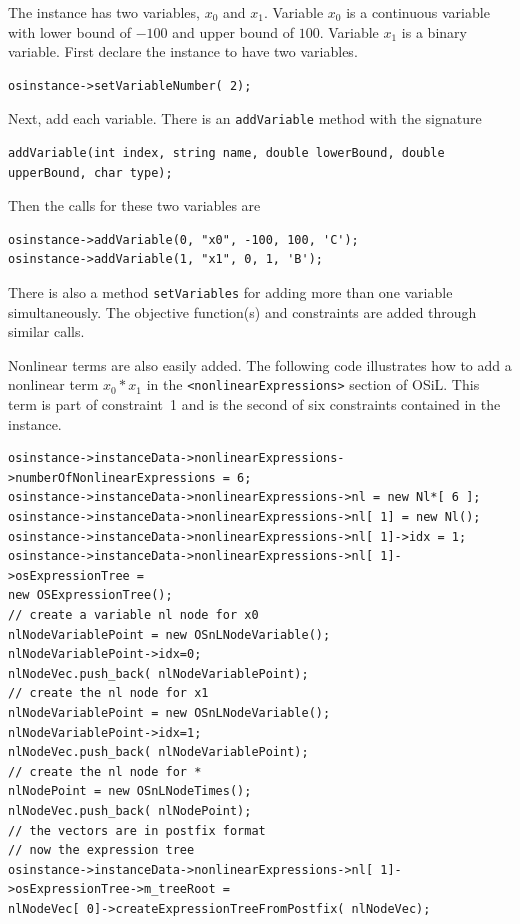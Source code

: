 \documentclass[11pt]{article}
\renewcommand{\_}{{\char"5F}}
\renewcommand{\{}{{\char"7B}}
\renewcommand{\}}{{\char"7D}}
\renewcommand{\^}{{\char"0D}}
\renewcommand{\'}{{\char"0D}}
\begin{document}
\begin{enumerate}[Step 1:]
The instance has two variables, $x_{0}$ and $x_{1}$. Variable $x_{0}$ is a continuous variable with lower bound of $-100$ and upper bound of $100$. Variable $x_{1}$ is a binary variable. First declare the instance to have two variables.
\begin{verbatim}
osinstance->setVariableNumber( 2);
\end{verbatim}
Next, add each variable. There is an {\tt addVariable} method with the signature
\begin{verbatim}
addVariable(int index, string name, double lowerBound, double upperBound, char type);
\end{verbatim}
Then the calls for these two variables are
\begin{verbatim}
osinstance->addVariable(0, "x0", -100, 100, 'C');
osinstance->addVariable(1, "x1", 0, 1, 'B');
\end{verbatim}
There is also a method {\tt setVariables} for adding more than one variable simultaneously.  The objective function(s) and constraints are added through similar calls.

Nonlinear terms are also easily added.  The following code illustrates how to add a nonlinear term
$x_{0}*x_{1}$ in the {\tt <nonlinearExpressions>} section of  OSiL. This term is part of constraint~1
and is the second of six constraints contained in the instance.
\begin{verbatim}
osinstance->instanceData->nonlinearExpressions->numberOfNonlinearExpressions = 6;
osinstance->instanceData->nonlinearExpressions->nl = new Nl*[ 6 ];
osinstance->instanceData->nonlinearExpressions->nl[ 1] = new Nl();
osinstance->instanceData->nonlinearExpressions->nl[ 1]->idx = 1;
osinstance->instanceData->nonlinearExpressions->nl[ 1]->osExpressionTree =
new OSExpressionTree();
// create a variable nl node for x0
nlNodeVariablePoint = new OSnLNodeVariable();
nlNodeVariablePoint->idx=0;
nlNodeVec.push_back( nlNodeVariablePoint);
// create the nl node for x1
nlNodeVariablePoint = new OSnLNodeVariable();
nlNodeVariablePoint->idx=1;
nlNodeVec.push_back( nlNodeVariablePoint);
// create the nl node for *
nlNodePoint = new OSnLNodeTimes();
nlNodeVec.push_back( nlNodePoint);
// the vectors are in postfix format
// now the expression tree
osinstance->instanceData->nonlinearExpressions->nl[ 1]->osExpressionTree->m_treeRoot =
nlNodeVec[ 0]->createExpressionTreeFromPostfix( nlNodeVec);
\end{verbatim}



\end{enumerate}
\end{document}
